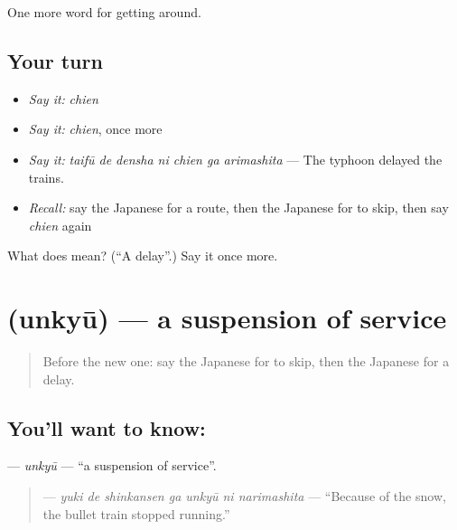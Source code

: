 \begin{grammarlens}[title={What you've built}]
One more word for getting around.
\end{grammarlens}

\subsection*{Your turn}
\begin{itemize}
\raggedright
  \item \emph{Say it:} \emph{chien}
  \item \emph{Say it:} \emph{chien}, once more
  \item \emph{Say it:} \emph{taifū de densha ni chien ga arimashita} — The typhoon delayed the trains.
  \item \emph{Recall:} say the Japanese for a route, then the Japanese for to skip, then say \emph{chien} again
\end{itemize}

\begin{tcolorbox}[breakable,colback=teal!4,colframe=teal!35!black,title={Before you move on}]
What does  mean? (\textquotedblleft{}A delay\textquotedblright{}.) Say it once more.
\end{tcolorbox}
\section[\texorpdfstring{\ja{うんきゅう} (unkyū)}{うんきゅう (unkyū)}]{ (unkyū) — a suspension of service}

\label{lesson:JA-C377-unkyuu}



\begin{quote}
Before the new one: say the Japanese for to skip, then the Japanese for a delay.
\end{quote}

\subsection*{You'll want to know: }
\textbf{} — \emph{unkyū} — \textquotedblleft{}a suspension of service\textquotedblright{}.

\begin{quote}
\textbf{   } — \emph{yuki de shinkansen ga unkyū ni narimashita} — \textquotedblleft{}Because of the snow, the bullet train stopped running.\textquotedblright{}
\end{quote}

